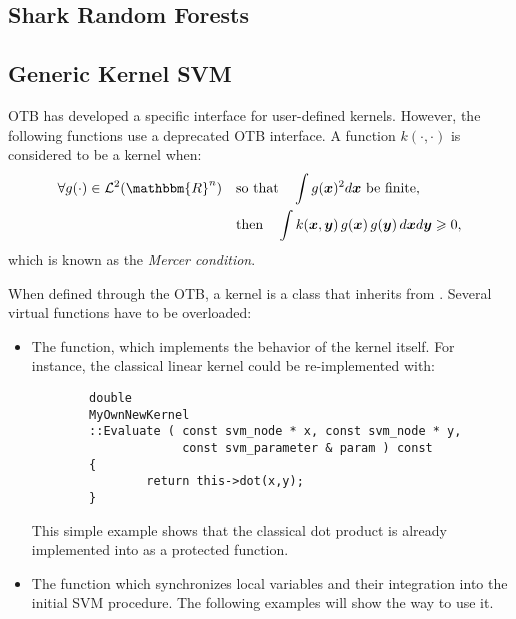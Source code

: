 \subsection{Shark Random Forests}

\subsection{Generic Kernel SVM}
OTB has developed a specific interface for user-defined kernels. However, the 
following functions use a deprecated OTB interface. A function 
$k(\cdot,\cdot)$ is considered to be a kernel when:
\begin{align}\label{eqMercer}
        \forall g(\cdot) \in {\cal L}^2(\mathbbm{R}^n) \quad & \text{so 
that} \quad
        \int g(\boldsymbol{x})^2 d\boldsymbol{x} \text{ be finite,} \\
        & \text{then} \quad \int k(\boldsymbol{x},\boldsymbol{y}) \, 
g(\boldsymbol{x})
        \, g(\boldsymbol{y}) \, d\boldsymbol{x} d\boldsymbol{y} \geqslant 0,
        \notag
\end{align}
which is known as the {\em Mercer condition\/}.

When defined through the OTB, a kernel is a class that inherits from
. Several virtual functions have to 
be overloaded:
\begin{itemize}
\item The  function, which implements the behavior of the 
kernel
itself. For instance, the classical linear kernel could be re-implemented
with:
\begin{verbatim}
        double
        MyOwnNewKernel
        ::Evaluate ( const svm_node * x, const svm_node * y,
                     const svm_parameter & param ) const
        {
                return this->dot(x,y);
        }
\end{verbatim}
This simple example shows that the classical dot product is already 
implemented
into  as a protected
function.
\item The  function which synchronizes local variables and 
their
integration into the initial SVM procedure. The following examples will show
the way to use it.
\end{itemize}

